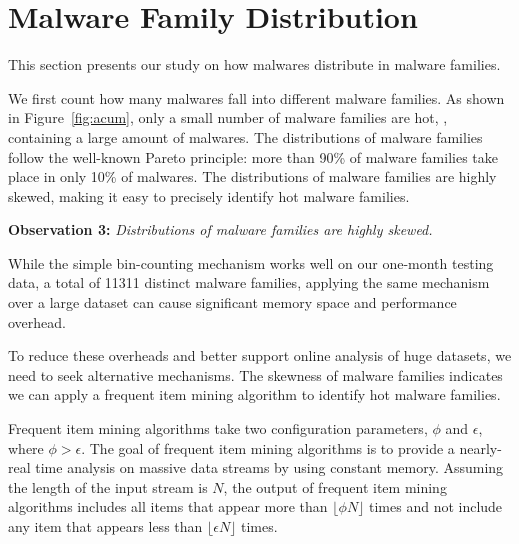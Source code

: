 \section{Malware Family Distribution}
\label{sec:dist}









This section presents our study on how malwares distribute in malware families. 

We first count how many malwares fall into different malware families.
As shown in Figure~\ref{fig:acum}, only a small number of malware families are hot, \ie, containing a large amount of malwares.
The distributions of malware families follow the well-known Pareto principle:  
more than 90\% of malware families take place in only 10\% of malwares. 
The distributions of malware families are highly skewed,
making it easy to precisely identify hot malware families. 

{\bf Observation 3:} {\em Distributions of malware families are highly skewed.} 

While the simple bin-counting mechanism works well on our one-month testing data, 
a total of 11311 distinct malware families, 
applying the same mechanism over a large dataset can cause significant memory space and performance overhead.

To reduce these overheads and better support online analysis of huge datasets, 
we need to seek alternative mechanisms.
The skewness of malware families indicates we can apply a frequent item mining algorithm to identify hot malware families. 

Frequent item mining algorithms take two configuration parameters, $\phi$ and $\epsilon$, where $\phi > \epsilon$. 
The goal of frequent item mining algorithms is to provide a nearly-real time analysis on massive data streams by using constant memory. 
Assuming the length of the input stream is $N$, the output of frequent item mining algorithms 
includes all items that appear more than $\lfloor \phi N \rfloor$ times 
and not include any item that appears less than  $\lfloor \epsilon N \rfloor$ times. 

